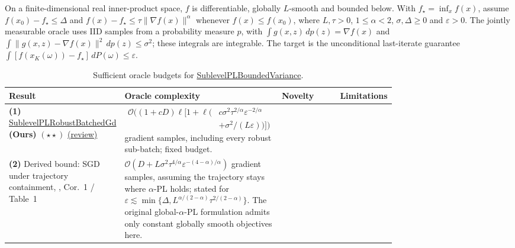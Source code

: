 \begin{table}[tp]
\centering
\caption{Sufficient oracle budgets for \href{https://github.com/k3nfalt/longtails/blob/main/LongTails/Setups/SublevelPLBoundedVariance.lean}{SublevelPLBoundedVariance}.}\label{tab:SublevelPLBoundedVariance}
\parbox{\linewidth}{\footnotesize On a finite-dimensional real inner-product space, $f$ is differentiable, globally $L$-smooth and bounded below. With $f_\star=\inf_x f(x)$, assume $f(x_0)-f_\star\le\Delta$ and $f(x)-f_\star\le\tau\|\nabla f(x)\|^\alpha$ whenever $f(x)\le f(x_0)$, where $L,\tau>0$, $1\le\alpha<2$, $\sigma,\Delta\ge0$ and $\varepsilon>0$. The jointly measurable oracle uses IID samples from a probability measure $p$, with $\int g(x,z)\,dp(z)=\nabla f(x)$ and $\int\|g(x,z)-\nabla f(x)\|^2\,dp(z)\le\sigma^2$; these integrals are integrable. The target is the unconditional last-iterate guarantee $\int [f(x_K(\omega))-f_\star]\,dP(\omega)\le\varepsilon$.}\par\smallskip
\begin{threeparttable}
\footnotesize
\setlength{\tabcolsep}{4pt}\renewcommand{\arraystretch}{1.25}
\begin{tabularx}{\linewidth}{@{}>{\raggedright\arraybackslash}p{0.20\linewidth}>{\raggedright\arraybackslash}p{0.32\linewidth}>{\raggedright\arraybackslash}p{0.235\linewidth}>{\raggedright\arraybackslash}X@{}}
\toprule
\textbf{Result} & \textbf{Oracle complexity} & \textbf{Novelty} & \textbf{Limitations} \\
\midrule
\textbf{(1)} \href{https://github.com/k3nfalt/longtails/blob/main/LongTails/Theorems/SublevelPLRobustBatchedGd.lean}{Sublevel\allowbreak PL\allowbreak Robust\allowbreak Batched\allowbreak Gd} \textbf{(Ours)} $(\star\star)$ \href{https://github.com/k3nfalt/longtails/blob/main/scripts/reviews/SublevelPLRobustBatchedGd.md}{(review)}
& $\begin{aligned}\mathcal{O}\!\bigl((1+cD)\ell\bigl[1+\ell(&c\sigma^2\tau^{2/\alpha}\varepsilon^{-2/\alpha}\\[-2pt]&+\sigma^2/(L\varepsilon))\bigr]\bigr)\end{aligned}$ gradient samples, including every robust sub-batch; fixed budget.
& & \\
\midrule[1.2pt]
\textbf{(2)} Derived bound: SGD under trajectory containment, \citep{splFatkhullin2022v1,splMasiha2026v3}, Cor.~1 / Table~1
& $\mathcal{O}\!\left(D+L\sigma^2\tau^{4/\alpha}\varepsilon^{-(4-\alpha)/\alpha}\right)$ gradient samples, assuming the trajectory stays where $\alpha$-PL holds; stated for $\varepsilon\lesssim\min\{\Delta,L^{\alpha/(2-\alpha)}\tau^{2/(2-\alpha)}\}$. The original global-$\alpha$-PL formulation admits only constant globally smooth objectives here.

\end{tabularx}
\end{threeparttable}
\end{table}
